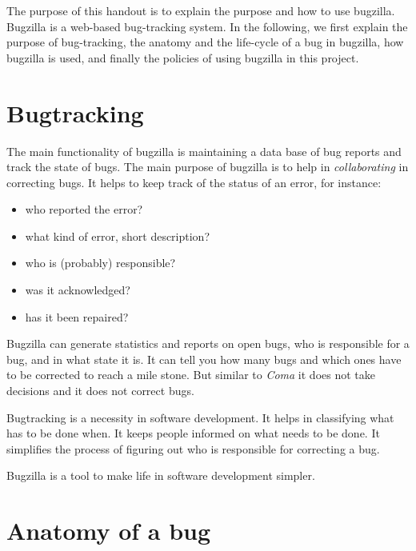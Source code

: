 \documentclass[11pt,handout]{handout}
\newcommand{\Coma}{\textsl{Coma}}
\begin{document}
\thispagestyle{empty}

The purpose of this handout is to explain the purpose and how to use
bugzilla.  Bugzilla is a web-based bug-tracking system.  In the following,
we first explain the purpose of bug-tracking, the anatomy and the
life-cycle of a bug in bugzilla, how bugzilla is used, and finally the
policies of using bugzilla in this project.


\section{Bugtracking}

The main functionality of bugzilla is maintaining a data base of
bug reports and track the state of bugs.  The main purpose of
bugzilla is to help in \emph{collaborating} in correcting bugs.
It helps to keep track of the status of an error, for instance:
\begin{itemize}
\item who reported the error?
\item what kind of error, short description?
\item who is (probably) responsible?
\item was it acknowledged?
\item has it been repaired?
\end{itemize}

Bugzilla can generate statistics and reports on open bugs, who is
responsible for a bug, and in what state it is.  It can tell you
how many bugs and which ones have to be corrected to reach a mile
stone.  But similar to {\Coma} it does not take decisions and it does
not correct bugs.

Bugtracking is a necessity in software development.  It helps in
classifying what has to be done when.  It keeps people informed on
what needs to be done.  It simplifies the process of figuring out
who is responsible for correcting a bug.

Bugzilla is a tool to make life in software development simpler.





\section{Anatomy of a bug}
\end{document}
